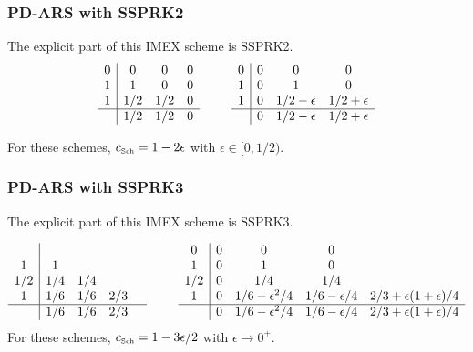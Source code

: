 \subsubsection{PD-ARS with SSPRK2}
The explicit part of this IMEX scheme is SSPRK2.
\begin{equation}
  \begin{array}{c | c c c}
  	0 & 0   & 0 & 0 \\
  	1 & 1   & 0 & 0 \\
  	1 & 1/2 & 1/2 & 0 \\ \hline
  	  & 1/2 & 1/2 & 0
  \end{array}
  \qquad
  \begin{array}{c | c c c}
  	0 & 0 & 0            & 0            \\
  	1 & 0 & 1            & 0            \\
  	1 & 0 & 1/2-\epsilon & 1/2+\epsilon \\ \hline
  	  & 0 & 1/2-\epsilon & 1/2+\epsilon
  \end{array}
\end{equation}

For these schemes, $c_{\mbox{\tiny Sch}}= 1 - 2\epsilon$ with $\epsilon \in [0, 1/2)$.

\subsubsection{PD-ARS with SSPRK3}
The explicit part of this IMEX scheme is SSPRK3.

\begin{equation}
  \begin{array}{c | c c c c}
  	    &     &     &     &  \\
  	 1  & 1   &     &     &  \\
  	1/2 & 1/4 & 1/4 &  \\
  	 1  & 1/6 & 1/6 & 2/3 &  \\ \hline
  	    & 1/6 & 1/6 & 2/3 &
  \end{array}
  \qquad
  \begin{array}{c | c c c c}
  	0 & 0 & 0            & 0            \\
  	1 & 0 & 1            & 0            \\
  	1/2 & 0 & 1/4 & 1/4 \\ 
  	1 & 0 & 1/6-\epsilon^2 /4 & 1/6-\epsilon/4 & 2/3+\epsilon(1+\epsilon)/4\\\hline
  	  & 0 & 1/6-\epsilon^2 /4 & 1/6-\epsilon/4 & 2/3+\epsilon(1+\epsilon)/4
  \end{array}
\end{equation}
For these schemes, $c_{\mbox{\tiny Sch}}= 1 - 3\epsilon/2$ with $\epsilon \rightarrow 0^{+}$.